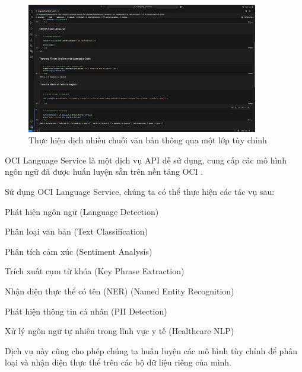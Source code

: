 \begin{figure}[H] %
    \centering
    \includegraphics[width=0.9\textwidth]{Demo/Dich_nhieu_chuoi_van_ban.jpg}
    \caption{Thực hiện dịch nhiều chuỗi văn bản thông qua một lớp tùy chỉnh}
    \label{fig:cloud_intro}
\end{figure}

OCI Language Service là một dịch vụ API dễ sử dụng, cung cấp các mô hình ngôn ngữ đã được huấn luyện sẵn trên nền tảng OCI \cite{medium_exploring_oci_language_service}.

Sử dụng OCI Language Service, chúng ta có thể thực hiện các tác vụ sau:

\begin{myitem}
    \item Phát hiện ngôn ngữ (Language Detection)

    \item Phân loại văn bản (Text Classification)
    
    \item Phân tích cảm xúc (Sentiment Analysis)
    
    \item Trích xuất cụm từ khóa (Key Phrase Extraction)
    
    \item Nhận diện thực thể có tên (NER) (Named Entity Recognition)
    
    \item Phát hiện thông tin cá nhân (PII Detection)
    
    \item Xử lý ngôn ngữ tự nhiên trong lĩnh vực y tế (Healthcare NLP)
\end{myitem}

Dịch vụ này cũng cho phép chúng ta huấn luyện các mô hình tùy chỉnh để phân loại và nhận diện thực thể trên các bộ dữ liệu riêng của mình.

